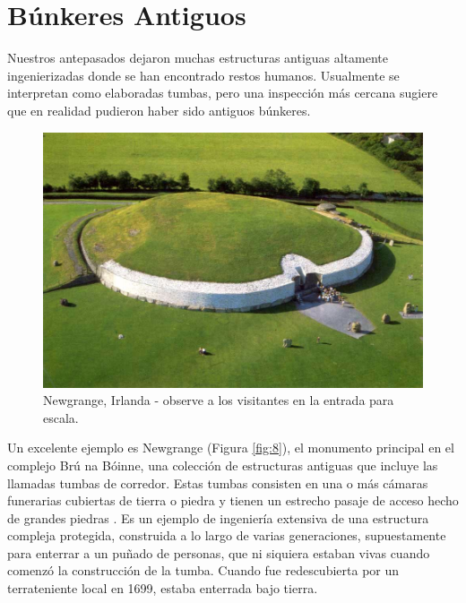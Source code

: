 \documentclass[10pt,twocolumn,letterpaper]{article}
\begin{document}
\section{Búnkeres Antiguos}

Nuestros antepasados dejaron muchas estructuras antiguas altamente ingenierizadas donde se han encontrado restos humanos. Usualmente se interpretan como elaboradas tumbas, pero una inspección más cercana sugiere que en realidad pudieron haber sido antiguos búnkeres.

\begin{figure}[b]
\begin{center}
   \includegraphics[width=1\linewidth]{ww19.jpg}
\end{center}
   \caption{Newgrange, Irlanda - observe a los visitantes en la entrada para escala.}
\label{fig:8}
\label{fig:onecol}
\end{figure}

Un excelente ejemplo es Newgrange (Figura \ref{fig:8}), el monumento principal en el complejo Brú na Bóinne, una colección de estructuras antiguas que incluye las llamadas tumbas de corredor. Estas tumbas consisten en una o más cámaras funerarias cubiertas de tierra o piedra y tienen un estrecho pasaje de acceso hecho de grandes piedras \cite{70}. Es un ejemplo de ingeniería extensiva de una estructura compleja protegida, construida a lo largo de varias generaciones, supuestamente para enterrar a un puñado de personas, que ni siquiera estaban vivas cuando comenzó la construcción de la tumba. Cuando fue redescubierta por un terrateniente local en 1699, estaba enterrada bajo tierra.
\end{document}
